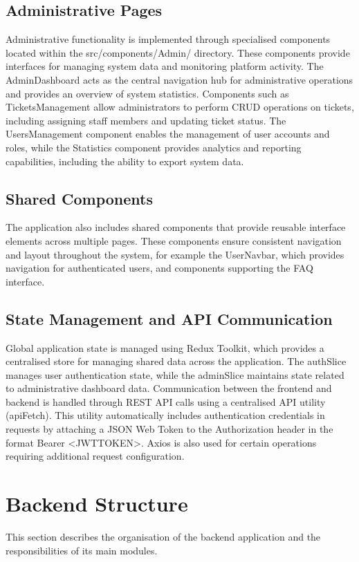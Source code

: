 \subsection{Administrative Pages}
Administrative functionality is implemented through specialised components located within the src/components/Admin/ directory. These components provide interfaces for managing system data and monitoring platform activity. The AdminDashboard acts as the central navigation hub for administrative operations and provides an overview of system statistics. Components such as TicketsManagement allow administrators to perform CRUD operations on tickets, including assigning staff members and updating ticket status. The UsersManagement component enables the management of user accounts and roles, while the Statistics component provides analytics and reporting capabilities, including the ability to export system data.

\subsection{Shared Components}
The application also includes shared components that provide reusable interface elements across multiple pages. These components ensure consistent navigation and layout throughout the system, for example the UserNavbar, which provides navigation for authenticated users, and components supporting the FAQ interface.

\subsection{State Management and API Communication}
Global application state is managed using Redux Toolkit, which provides a centralised store for managing shared data across the application. The authSlice manages user authentication state, while the adminSlice maintains state related to administrative dashboard data. Communication between the frontend and backend is handled through REST API calls using a centralised API utility (apiFetch). This utility automatically includes authentication credentials in requests by attaching a JSON Web Token to the Authorization header in the format Bearer <JWT\textunderscore TOKEN>. Axios is also used for certain operations requiring additional request configuration.



\section{Backend Structure}
\label{sec:backend-structure}
This section describes the organisation of the backend application and the responsibilities of its main modules.

